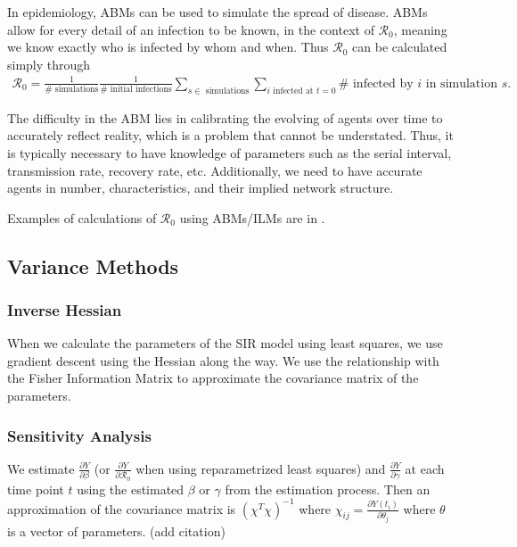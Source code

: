 \documentclass[12pt]{article}
\newcommand{\rr}{\ensuremath{\mathcal{R}_0}}
\begin{document}
In epidemiology, ABMs can be used to simulate the spread of disease.  ABMs allow for every detail of an infection to be known, in the context of $\rr$, meaning we know exactly who is infected by whom and when.  Thus $\rr$ can be calculated simply through
\begin{align*}
  \rr = \frac{1}{\# \text{ simulations}}\frac{1}{\#\text{ initial infections}} \sum_{s \in \text{ simulations}}\sum_{i \text{ infected at } t=0} \# \text{ infected by $i$ in simulation }s.
\end{align*}

The difficulty in the ABM lies in calibrating the evolving of agents over time to accurately reflect reality, which is a problem that cannot be understated.  Thus, it is typically necessary to have knowledge of parameters such as the serial interval, transmission rate, recovery rate, etc.  Additionally, we need to have accurate agents in number, characteristics, and their implied network structure.

Examples of calculations of $\rr$ using ABMs/ILMs are in \cite{breban2007,ahmed2013variance}.





\subsection{Variance Methods}
\label{sec:methods}

\subsubsection{Inverse Hessian}\label{inverse-hessian}

When we calculate the parameters of the SIR model using least squares,
we use gradient descent using the Hessian along the way. We use the
relationship with the Fisher Information Matrix to approximate the
covariance matrix of the parameters.

\subsubsection{Sensitivity Analysis}\label{sensitivity-analysis}

We estimate \(\frac{\partial Y}{\partial \beta}\) (or
\(\frac{\partial Y}{\partial \rr}\) when using reparametrized least
squares) and \(\frac{\partial Y}{\partial \gamma}\) at each time point
\(t\) using the estimated \(\beta\) or \(\gamma\) from the estimation
process. Then an approximation of the covariance matrix is
\((\chi^T \chi)^{-1}\) where
\(\chi_{ij} = \frac{ \partial Y(t_i)}{ \partial \theta_j}\) where
\(\theta\) is a vector of parameters. (add citation)
\end{document}
